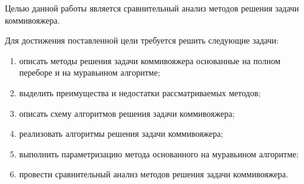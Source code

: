
Целью данной работы является сравнительный анализ методов решения задачи коммивояжера.

Для достижения поставленной цели требуется решить следующие задачи:
\begin{enumerate}[label={\arabic*)}]
	\item описать методы решения задачи коммивояжера основанные на полном переборе и на муравьином алгоритме;
	\item выделить преимущества и недостатки рассматриваемых методов;
	\item описать схему алгоритмов решения задачи коммивояжера;
	\item реализовать алгоритмы решения задачи коммивояжера;
	\item выполнить параметризацию метода основанного на муравьином алгоритме;
	\item провести сравнительный анализ методов решения задачи коммивояжера.
\end{enumerate}

\clearpage
